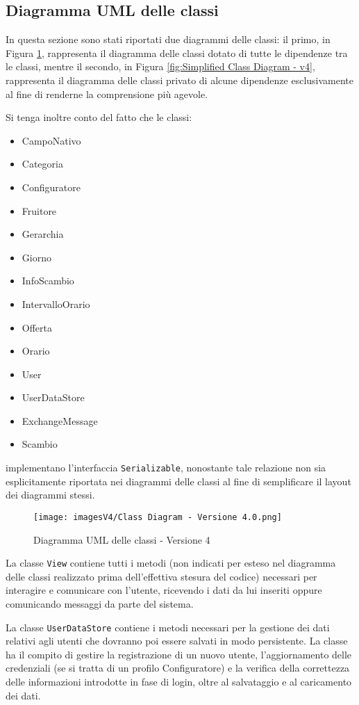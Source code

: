 \subsection{Diagramma UML delle classi}
In questa sezione sono stati riportati due diagrammi delle classi: il primo, in Figura \ref{fig:Class Diagram - v4}, rappresenta il diagramma delle classi dotato di tutte le dipendenze tra le classi, mentre il secondo, in Figura \ref{fig:Simplified Class Diagram - v4}, rappresenta il diagramma delle classi privato di alcune dipendenze esclusivamente al fine di renderne la comprensione più agevole.

Si tenga inoltre conto del fatto che le classi:
\begin{itemize}
    \item CampoNativo
    \item Categoria
    \item Configuratore
    \item Fruitore
    \item Gerarchia
    \item Giorno
    \item InfoScambio
    \item IntervalloOrario
    \item Offerta
    \item Orario
    \item User
    \item UserDataStore
    \item ExchangeMessage
    \item Scambio
\end{itemize}
implementano l'interfaccia \texttt{Serializable}, nonostante tale relazione non sia esplicitamente riportata nei diagrammi delle classi al fine di semplificare il layout dei diagrammi stessi.

\begin{figure}[h!]
    \centering
    \texttt{[image: imagesV4/Class Diagram - Versione 4.0.png]}
    \caption{\label{fig:Class Diagram - v4}Diagramma UML delle classi - Versione 4}
\end{figure} 

La classe \texttt{View} contiene tutti i metodi (non indicati per esteso nel diagramma delle classi realizzato prima dell'effettiva stesura del codice) necessari per interagire e comunicare con l'utente, ricevendo i dati da lui inseriti oppure comunicando messaggi da parte del sistema.

La classe \texttt{UserDataStore} contiene i metodi necessari per la gestione dei dati relativi agli utenti che dovranno poi essere salvati in modo persistente. La classe ha il compito di gestire la registrazione di un nuovo utente, l'aggiornamento delle credenziali (se si tratta di un profilo Configuratore) e la verifica della correttezza delle informazioni introdotte in fase di login, oltre al salvataggio e al caricamento dei dati. 

